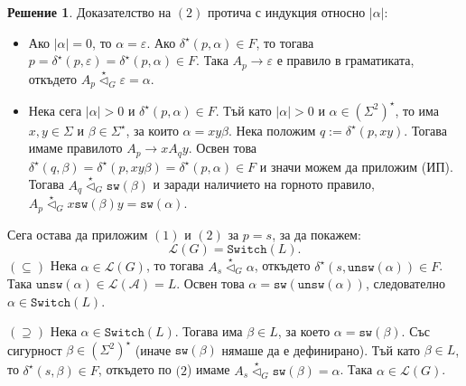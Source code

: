 \documentclass[12pt]{article}
\newcommand{\calA}{\mathcal{A}}
\newcommand{\calL}{\mathcal{L}}
\newcommand{\tri}[1]{\stackrel{#1}{\vartriangleleft}}
\theoremstyle{definition}
\newtheorem*{solution}{Решение}
\begin{document}
\begin{solution}
  \newpage
  Доказателство на $(2)$ протича с индукция относно $|\alpha|$:
  \begin{itemize}
    \item[(База)] Ако $|\alpha| = 0$, то $\alpha = \varepsilon$.
                  Ако $\delta^\star(p, \alpha) \in F$, то тогава $p = \delta^\star(p, \varepsilon) = \delta^\star(p, \alpha) \in F$.
                  Така $A_p \rightarrow \varepsilon$ е правило в граматиката, откъдето $A_p \tri{\star}_G \varepsilon = \alpha$.
    \item[(ИС)] Нека сега $|\alpha| > 0$ и $\delta^\star(p, \alpha) \in F$.
                Тъй като $|\alpha| > 0$ и $\alpha \in (\Sigma^2)^\star$, то има $x, y \in \Sigma$ и $\beta \in \Sigma^\star$, за които $\alpha = x y \beta$.
                Нека положим $q := \delta^\star(p, xy)$.
                Тогава имаме правилото $A_p \rightarrow x A_q y$.
                Освен това $\delta^\star(q, \beta) = \delta^\star(p, x y \beta) = \delta^\star(p, \alpha) \in F$ и значи можем да приложим (ИП).
                Тогава $A_q \tri{\star}_G \texttt{sw}(\beta)$ и заради наличието на горното правило, $A_p \tri{\star}_G x \texttt{sw}(\beta) y = \texttt{sw}(\alpha)$.
  \end{itemize}
  Сега остава да приложим $(1)$ и $(2)$ за $p = s$, за да покажем:
  \[
    \calL(G) = \texttt{Switch}(L).
  \]
  $(\subseteq)$ Нека $\alpha \in \calL(G)$, то тогава $A_s \tri{\star}_G \alpha$, откъдето $\delta^\star(s, \texttt{unsw}(\alpha)) \in F$.
  Така $\texttt{unsw}(\alpha) \in \calL(\calA) = L$.
  Освен това $\alpha = \texttt{sw}(\texttt{unsw}(\alpha))$, следователно $\alpha \in \texttt{Switch}(L)$.

  $(\supseteq)$ Нека $\alpha \in \texttt{Switch}(L)$.
  Тогава има $\beta \in L$, за което $\alpha = \texttt{sw}(\beta)$.
  Със сигурност $\beta \in (\Sigma^2)^\star$ (иначе $\texttt{sw}(\beta)$ нямаше да е дефинирано).
  Тъй като $\beta \in L$, то $\delta^\star(s, \beta) \in F$, откъдето по $(2$) имаме $A_s \tri{\star}_G \texttt{sw}(\beta) = \alpha$.
  Така $\alpha \in \calL(G)$.


\end{solution}
\end{document}
